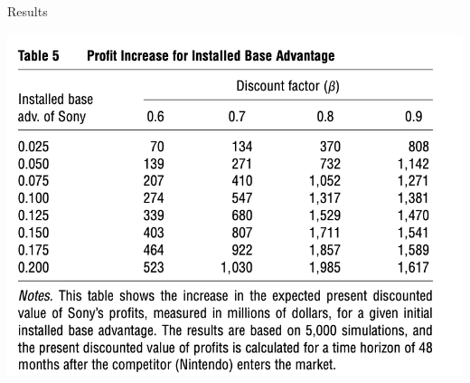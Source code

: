 \begin{frame}{Results}
\begin{center}
\includegraphics[scale=0.75]{resources/dube-table5}
\end{center}
\end{frame}
















































